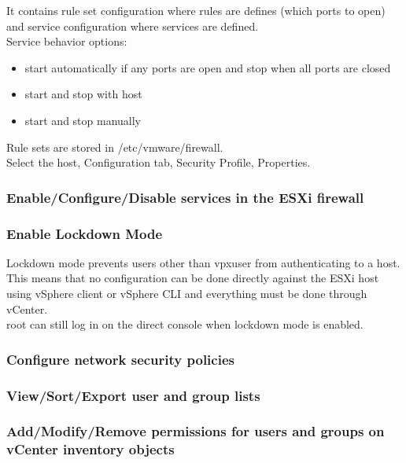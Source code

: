 It contains rule set configuration where rules are defines (which ports to
open) and service configuration where services are defined.\\

Service behavior options:

\begin{itemize}

\item start automatically if any ports are open and stop when all ports are
closed

\item start and stop with host

\item start and stop manually

\end{itemize}

Rule sets are stored in /etc/vmware/firewall.\\

Select the host, Configuration tab, Security Profile, Properties.

\subsubsection{Enable/Configure/Disable services in the ESXi firewall}

\subsubsection{Enable Lockdown Mode}

Lockdown mode prevents users other than vpxuser from authenticating to a host.
This means that no configuration can be done directly against the ESXi host
using vSphere client or vSphere CLI and everything must be done through
vCenter.\\

root can still log in on the direct console when lockdown mode is enabled.

\subsubsection{Configure network security policies}

\subsubsection{View/Sort/Export user and group lists}

\subsubsection{Add/Modify/Remove permissions for users and groups on vCenter inventory objects}


